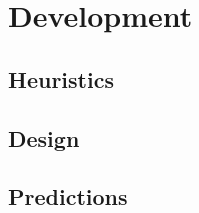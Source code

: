 \chapter{Development}
\label{ch:Development}

\section{Heuristics}
\label{sec:Heuristics}


\section{Design}
\label{sec:Design}

\section{Predictions}
\label{sec:Predictions}

\endinput

Any text after an \endinput is ignored.
You could put scraps here or things in progress.